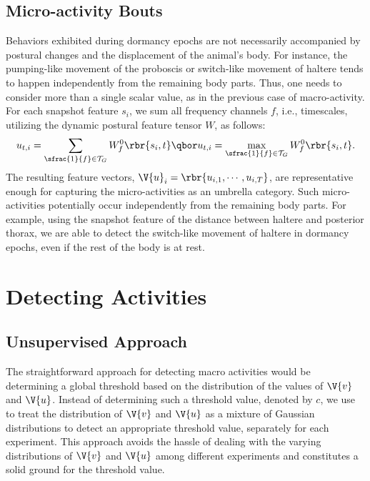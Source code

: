 \subsection{Micro-activity Bouts}\label{section:micro-activities}
Behaviors exhibited during dormancy epochs are not necessarily accompanied by postural changes and the displacement of the animal's body.
For instance, the pumping-like movement of the proboscis or switch-like movement of haltere tends to happen independently from the remaining body parts.
Thus, one needs to consider more than a single scalar value, as in the previous case of macro-activity.
For each snapshot feature $s_i$, we sum all frequency channels $f$, i.e., timescales, utilizing the dynamic postural feature tensor $W$, as follows:
\begin{equation}
	u_{t,i} = \sum_{\sfrac{1}{f} \in \mathcal{T}_G}{W_f^0\rbr{s_i,t}} \qbor
	u_{t,i} = \max_{\sfrac{1}{f} \in \mathcal{T}_G}{W_f^0\rbr{s_i,t}}.
\end{equation}
The resulting feature vectors, $\V{u}_i=\rbr{u_{i,1}, \cdots, u_{i,T}}$, are representative enough for capturing the micro-activities as an umbrella category.
Such micro-activities potentially occur independently from the remaining body parts.
For example, using the snapshot feature of the distance between haltere and posterior thorax, we are able to detect the switch-like movement of haltere in dormancy epochs, even if the rest of the body is at rest.

\section{Detecting Activities}\label{section:detecting-activities}
\subsection{Unsupervised Approach}\label{section:unsupervised-detection}
The straightforward approach for detecting macro activities would be determining a global threshold based on the distribution of the values of $\V{v}$ and $\V{u}$.
Instead of determining such a threshold value, denoted by $c$, we use to treat the distribution of $\V{v}$ and $\V{u}$ as a mixture of Gaussian distributions to detect an appropriate threshold value, separately for each experiment.
This approach avoids the hassle of dealing with the varying distributions of $\V{v}$ and $\V{u}$ among different experiments and constitutes a solid ground for the threshold value.

